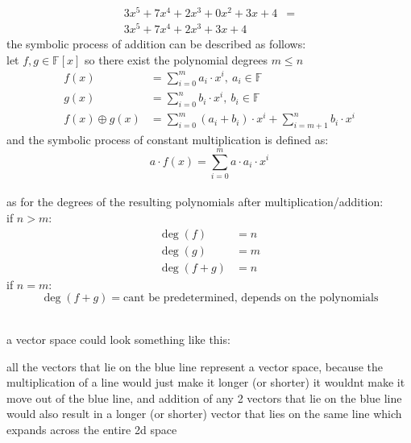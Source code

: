 \documentclass[a4paper,12pt]{article}
\begin{document}
\begin{definition}
\begin{my_example}
\begin{align*}
3x^5 + 7x^4 + 2x^3 + 0x^2 + 3x + 4&=\\
3x^5 + 7x^4 + 2x^3 + 3x + 4&
\end{align*}
the symbolic process of addition can be described as follows:\\
let \(f, g \in \mathbb{F}[x]\) so there exist the polynomial degrees \(m \leq n\)\\
\begin{align*}
  f(x) &= \sum_{i=0}^{m} a_i \cdot x^i,\ a_i \in \mathbb{F}\\
  g(x) &= \sum_{i=0}^{n} b_i \cdot x^i,\ b_i \in \mathbb{F}\\
  f(x) \oplus g(x) &= \sum_{i=0}^{m} (a_i + b_i) \cdot x^i + \sum_{i=m+1}^{n} b_i \cdot x^i
\end{align*}
and the symbolic process of constant multiplication is defined as:\\
\[ a \cdot f(x) = \sum_{i=0}^{m} a \cdot a_i \cdot x^i \]\\
as for the degrees of the resulting polynomials after multiplication/addition:\\
if \(n > m\):\\
\begin{align*}
  \deg(f) &= n\\
  \deg(g) &= m\\
  \deg(f+g) &= n
\end{align*}
if \(n = m\):\\
\[ \deg(f+g) = \text{cant be predetermined, depends on the polynomials} \]\\
\end{my_example}
\begin{my_example}
a vector space could look something like this:\\
\begin{center}

\end{center}

all the vectors that lie on the blue line represent a vector space, because the multiplication of a line would just make it longer (or shorter) it wouldnt make it move out of the blue line, and addition of any 2 vectors that lie on the blue line would also result in a longer (or shorter) vector that lies on the same line which expands across the entire 2d space\\
\end{my_example}
\begin{my_example}
\begin{center}

\end{center}


\end{my_example}
\end{definition}
\end{document}
